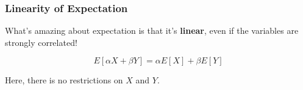 \documentclass[12pt]{article}
\begin{document}
  \subsubsection{Linearity of Expectation}

  What's amazing about expectation is that it's {\bf linear}, even if the
  variables are strongly correlated!

  \[
    E[\alpha X + \beta Y] = \alpha E[X] + \beta E[Y]
  \]

  Here, there is no restrictions on $X$ and $Y$.

\end{document}
